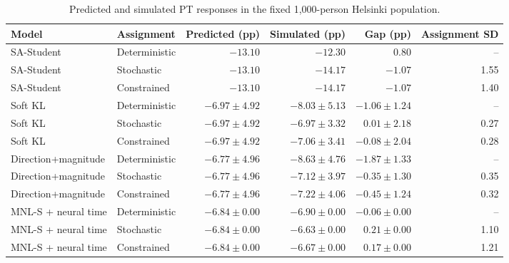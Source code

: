 \begin{table}[pos=!ht]
\centering\small
\caption{Predicted and simulated PT responses in the fixed 1,000-person Helsinki population.}
\label{tab:execution_main}
\setlength{\tabcolsep}{3pt}
\renewcommand{\arraystretch}{1.12}
\begin{tabular*}{\linewidth}{@{\extracolsep{\fill}}llrrrr@{}}
\toprule
Model & Assignment & Predicted (pp) & Simulated (pp) & Gap (pp) & Assignment SD \\
\midrule
SA-Student & Deterministic & $-13.10$ & $-12.30$ & $0.80$ & -- \\
SA-Student & Stochastic & $-13.10$ & $-14.17$ & $-1.07$ & 1.55 \\
SA-Student & Constrained & $-13.10$ & $-14.17$ & $-1.07$ & 1.40 \\
Soft KL & Deterministic & $-6.97\pm4.92$ & $-8.03\pm5.13$ & $-1.06\pm1.24$ & -- \\
Soft KL & Stochastic & $-6.97\pm4.92$ & $-6.97\pm3.32$ & $0.01\pm2.18$ & 0.27 \\
Soft KL & Constrained & $-6.97\pm4.92$ & $-7.06\pm3.41$ & $-0.08\pm2.04$ & 0.28 \\
Direction+magnitude & Deterministic & $-6.77\pm4.96$ & $-8.63\pm4.76$ & $-1.87\pm1.33$ & -- \\
Direction+magnitude & Stochastic & $-6.77\pm4.96$ & $-7.12\pm3.97$ & $-0.35\pm1.30$ & 0.35 \\
Direction+magnitude & Constrained & $-6.77\pm4.96$ & $-7.22\pm4.06$ & $-0.45\pm1.24$ & 0.32 \\
MNL-S + neural time & Deterministic & $-6.84\pm0.00$ & $-6.90\pm0.00$ & $-0.06\pm0.00$ & -- \\
MNL-S + neural time & Stochastic & $-6.84\pm0.00$ & $-6.63\pm0.00$ & $0.21\pm0.00$ & 1.10 \\
MNL-S + neural time & Constrained & $-6.84\pm0.00$ & $-6.67\pm0.00$ & $0.17\pm0.00$ & 1.21 \\
\bottomrule
\end{tabular*}
\par{}
\end{table}
